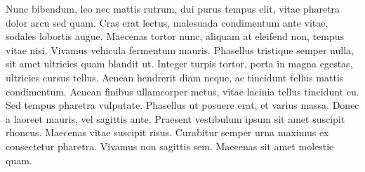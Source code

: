 \documentclass{article}
\begin{document}
    Nunc bibendum, leo nec mattis rutrum, dui purus tempus elit, vitae pharetra dolor arcu sed quam. Cras erat lectus, malesuada condimentum ante vitae, sodales lobortis augue. Maecenas tortor nunc, aliquam at eleifend non, tempus vitae nisi. Vivamus vehicula fermentum mauris. Phasellus tristique semper nulla, sit amet ultricies quam blandit ut. Integer turpis tortor, porta in magna egestas, ultricies cursus tellus. Aenean hendrerit diam neque, ac tincidunt tellus mattis condimentum. Aenean finibus ullamcorper metus, vitae lacinia tellus tincidunt eu. Sed tempus pharetra vulputate. Phasellus ut posuere erat, et varius massa. Donec a laoreet mauris, vel sagittis ante. Praesent vestibulum ipsum sit amet suscipit rhoncus. Maecenas vitae suscipit risus. Curabitur semper urna maximus ex consectetur pharetra. Vivamus non sagittis sem. Maecenas sit amet molestie quam.



   
\end{document}
